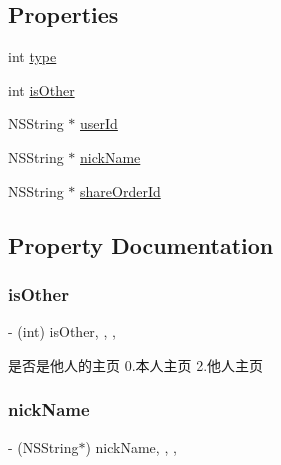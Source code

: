 \subsection*{Properties}
\begin{DoxyCompactItemize}
\item 
int \mbox{\hyperlink{interface_follower_view_controller_a5181c8b6eed3b80a2b299b9d5443a573}{type}}
\item 
int \mbox{\hyperlink{interface_follower_view_controller_afbe2842fdcc38405aa773c27b85fe62e}{is\+Other}}
\item 
N\+S\+String $\ast$ \mbox{\hyperlink{interface_follower_view_controller_afe4de0a5e6ca664b3ce604c6e636186d}{user\+Id}}
\item 
N\+S\+String $\ast$ \mbox{\hyperlink{interface_follower_view_controller_aa2e2cbf5ab0d0d8e0d61723ef2e593fd}{nick\+Name}}
\item 
N\+S\+String $\ast$ \mbox{\hyperlink{interface_follower_view_controller_a48652114a2a038742e584da3b081dd3d}{share\+Order\+Id}}
\end{DoxyCompactItemize}


\subsection{Property Documentation}
\mbox{\label{interface_follower_view_controller_afbe2842fdcc38405aa773c27b85fe62e}} 
\subsubsection{\texorpdfstring{is\+Other}{isOther}}
{\footnotesize\ttfamily -\/ (int) is\+Other\hspace{0.3cm}{\ttfamily [read]}, {\ttfamily [write]}, {\ttfamily [nonatomic]}, {\ttfamily [assign]}}

是否是他人的主页 0.本人主页 2.他人主页 \mbox{\label{interface_follower_view_controller_aa2e2cbf5ab0d0d8e0d61723ef2e593fd}} 
\subsubsection{\texorpdfstring{nick\+Name}{nickName}}
{\footnotesize\ttfamily -\/ (N\+S\+String$\ast$) nick\+Name\hspace{0.3cm}{\ttfamily [read]}, {\ttfamily [write]}, {\ttfamily [nonatomic]}, {\ttfamily [strong]}}

